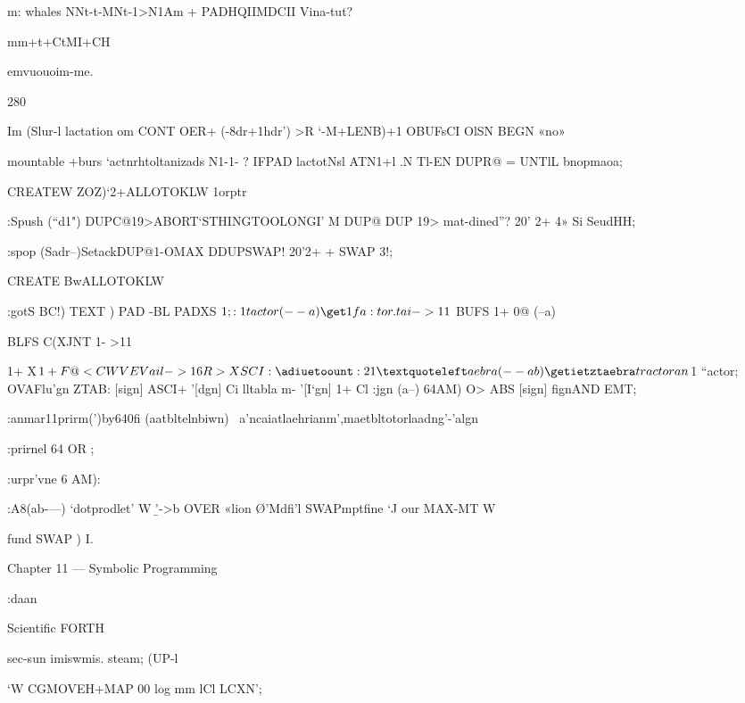 m:
whales NNt-t-MNt-1>N1Am +
\uanNerNi
PADHQIIMDCII Vina-tut?

mm+t+CtMI+CH

emvuouoim-me.

280

Im (Slur-l \dleornpoaainbtaetm
lactation om \mallnnnlo
CONT OER+ (-8dr+1hdr’) \ddreuaa
>R \M‘-M+LENB)+1
OBUFsCI \lnithullot
OlSN \tnltN
BEGN «no» \tnglnioopmeltacu

mountable \prwantmullbieantiu
+burs \addi‘actnrhtoltanizads
N1-1- \notintabla?
IFPAD lactot{N}sl \putintnblo
ATN1+l \lne.N
Tl-EN
DUPR@ = UNTlL \ondloop
bnopmaoa; \eloanup

\ENOPARSEWGIDS

\Setaek

CREATEW ZOZ)‘2+ALLOTOKLW \21orptr

:Spush (“d1")
DUPC@19>ABORT‘STHINGTOOLONGI'
M DUP@ DUP 19> mat-dined”?
20' 2+ 4» Si SeudHH;

:spop (Sadr--)SetackDUP@1-OMAX
DDUPSWAP!
20'2+ + SWAP 3!;

\ondsmak

CREATE BwALLOTOKLW \mlminpmahils

:gotS BC!) TEXT )
PAD -BL \deletebianlra
PADXS $1;

:1tactor (--a) \get1fa:tor.tai-> 11$
BUFS 1+ 0@ (--a)

BLFS C(XJNT 1- >11

1+ X$1+F@<CWVE Vail->16

R> XSCI: \adiuetoount
:21‘aebra(--ab) \getietztaebra

tractoran $1 “actor;
OVAFlu'gn \emitmrreetalgn
ZTAB: [sign] \maltehbla
ASCI+ '[dgn] Ci \1lltabla
m- '[I‘gn] 1+ Cl
:jgn (a--) 64AM) O> ABS [sign] ﬁgnAND EMT;

\Nob:anmar11prirm(')by640ﬁ (aatbltelnbiwn)
\ a'ncaiatlaehrianm',maetbltotorlaadng'-'algn

:prirnel 64 OR ;

:urpr'vne 6 AM):

:A8(ab-—) \emll‘dotprodlet'
W \b'->b
OVER «lion \O'Mdﬁ'l
SWAPmptﬁne ‘J
our MAX-MT W 

fund SWAP ) I.

Chapter 11 — Symbolic Programming

:daan

 

Scientiﬁc FORTH

sec-sun imiswmis. steam;
(UP-l

\MI‘W
CGMOVEH+MAP
00 log mm lCl LCXN';

